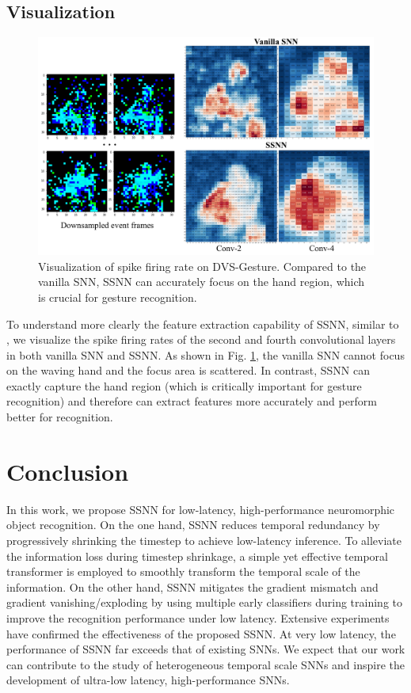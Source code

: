 \documentclass[letterpaper]{article} %
\begin{document}
\subsection{Visualization}
\label{Visualization}
\begin{figure}[!t]
\centering
\includegraphics[width=0.95\columnwidth]{event_gesture}
\caption{Visualization of spike firing rate on DVS-Gesture. Compared to the vanilla SNN, SSNN can accurately focus on the hand region, which is crucial for gesture recognition.}
\label{firing_rate}
\end{figure}

To understand more clearly the feature extraction capability of SSNN, similar to \cite{10032591}, we visualize the spike firing rates of the second and fourth convolutional layers in both vanilla SNN and SSNN. As shown in Fig. \ref{firing_rate}, the vanilla SNN cannot focus on the waving hand and the focus area is scattered. In contrast, SSNN can exactly capture the hand region (which is critically important for gesture recognition) and therefore can extract features more accurately and perform better for recognition.

\section{Conclusion}
\label{Conclusion}
In this work, we propose SSNN for low-latency, high-performance neuromorphic object recognition. On the one hand, SSNN reduces temporal redundancy by progressively shrinking the timestep to achieve low-latency inference. To alleviate the information loss during timestep shrinkage, a simple yet effective temporal transformer is employed to smoothly transform the temporal scale of the information. On the other hand, SSNN mitigates the gradient mismatch and gradient vanishing/exploding by using multiple early classifiers during training to improve the recognition performance under low latency. Extensive experiments have confirmed the effectiveness of the proposed SSNN. At very low latency, the performance of SSNN far exceeds that of existing SNNs. We expect that our work can contribute to the study of heterogeneous temporal scale SNNs and inspire the development of ultra-low latency, high-performance SNNs.
\end{document}
